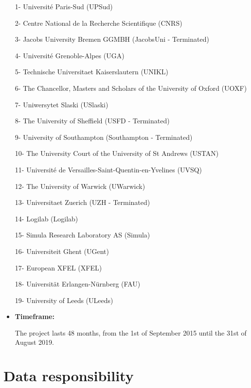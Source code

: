 \documentclass{deliverablereport}
\begin{document}
\begin{itemize}
\begin{enumerate}
\item[1-] Université Paris-Sud (UPSud)
\item[2-] Centre National de la Recherche Scientifique (CNRS)
\item[3-] Jacobs University Bremen GGMBH (JacobsUni - Terminated)
\item[4-] Université Grenoble-Alpes (UGA)
\item[5-] Technische Universitaet Kaiserslautern (UNIKL)
\item[6-] The Chancellor, Masters and Scholars of the University of Oxford (UOXF)
\item[7-] Uniwersytet Slaski (USlaski)
\item[8-] The University of Sheffield (USFD - Terminated)
\item[9-] University of Southampton (Southampton - Terminated)
\item[10-] The University Court of the University of St Andrews (USTAN)
\item[11-] Université de Versailles-Saint-Quentin-en-Yvelines (UVSQ)
\item[12-] The University of Warwick (UWarwick)
\item[13-] Universitaet Zuerich (UZH - Terminated)
\item[14-] Logilab (Logilab)
\item[15-] Simula Research Laboratory AS (Simula)
\item[16-] Universiteit Ghent (UGent)
\item [17-] European XFEL (XFEL)
\item [18-] Universität Erlangen-Nürnberg (FAU)
\item [19-] University of Leeds (ULeeds)
\end{enumerate}
\end{itemize}

\newpage
\begin{itemize} 
\item\textbf{Timeframe:}

The project lasts 48 months, from the 1st of September 2015 until the 31st of August 2019.
\end{itemize}

\section{Data responsibility}
\end{document}
